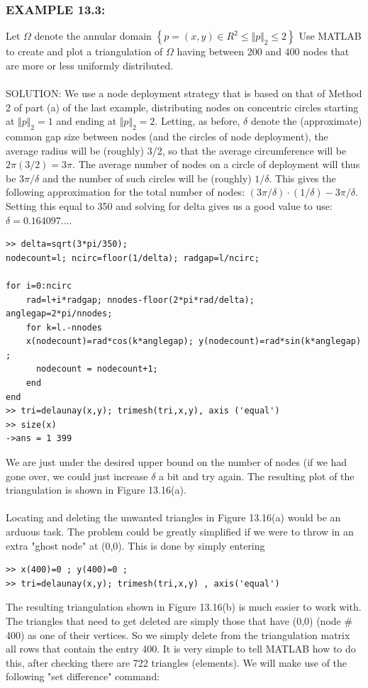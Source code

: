 \documentclass[../main.tex]{subfiles}
\begin{document}
\subsubsection{EXAMPLE 13.3:} Let $\Omega$ denote the annular domain $\left\{ p = (x,y) \in  R^2 \leqslant \Vert p \Vert_2 \leqslant 2 \right\}$  Use MATLAB to create and plot a triangulation of $\Omega$ having between 200 
and 400 nodes that are more or less uniformly distributed.
\\
\\
SOLUTION: We use a node deployment strategy that is based on that of Method 
2 of part (a) of the last example, distributing nodes on concentric circles starting at $\Vert p \Vert_2 = 1$ and ending at $\Vert p \Vert_2 = 2$. Letting, as before, $\delta$ denote the (approximate) 
common gap size between nodes (and the circles of node deployment), the average 
radius will be (roughly) 3/2, so that the average circumference will be 
$2\pi\left( 3/2 \right) = 3\pi$. The average number of nodes on a circle of deployment will thus 
be $3\pi/\delta$ and the number of such circles will be (roughly) $1/\delta$. This gives the following approximation for the total number of nodes: $(3\pi/\delta)\cdot(1/\delta)-3\pi/\delta$. 
Setting this equal to 350 and solving for delta gives us a good value to use: 
$\delta = 0.164097...$.
\\
\begin{lstlisting}[numbers=none,frame=none]
>> delta=sqrt(3*pi/350); 
nodecount=l; ncirc=floor(1/delta); radgap=l/ncirc; 

for i=0:ncirc 
	rad=l+i*radgap; nnodes-floor(2*pi*rad/delta); anglegap=2*pi/nnodes; 
	for k=l.-nnodes 
	x(nodecount)=rad*cos(k*anglegap); y(nodecount)=rad*sin(k*anglegap) ; 
	  nodecount = nodecount+1; 
	end 
end 
>> tri=delaunay(x,y); trimesh(tri,x,y), axis ('equal') 
>> size(x) 
->ans = 1 399
\end{lstlisting}

We are just under the desired upper bound on the number of nodes (if we had gone 
over, we could just increase $\delta$ a bit and try again. The resulting plot of the 
triangulation is shown in Figure 13.16(a).
\\
\\ 
Locating and deleting the unwanted triangles in Figure 13.16(a) would be an 
arduous task. The problem could be greatly simplified if we were to throw in an 
extra "ghost node" at (0,0). This is done by simply entering 
\begin{lstlisting}[numbers=none,frame=none]
>> x(400)=0 ; y(400)=0 ; 
>> tri=delaunay(x,y); trimesh(tri,x,y) , axis('equal')
\end{lstlisting}
The resulting triangulation shown in Figure 13.16(b) is much easier to work with. 
The triangles that need to get deleted are simply those that have (0,0) (node $\#$400) 
as one of their vertices. So we simply delete from the triangulation matrix all rows 
that contain the entry 400. It is very simple to tell MATLAB how to do this, after 
checking there are 722 triangles (elements). We will make use of the following 
"set difference" command:
\end{document}
